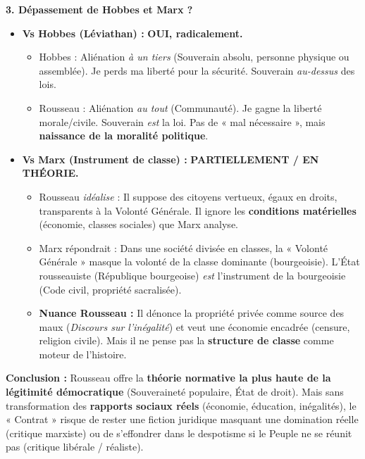 \documentclass[11pt]{article}
\begin{document}
\begin{exoresolu}
\textbf{3. Dépassement de Hobbes et Marx ?}
\begin{itemize}
    \item \textbf{Vs Hobbes (Léviathan) :} \textbf{OUI, radicalement.}
    \begin{itemize}
        \item Hobbes : Aliénation \emph{à un tiers} (Souverain absolu, personne physique ou assemblée). Je perds ma liberté pour la sécurité. Souverain \emph{au-dessus} des lois.
        \item Rousseau : Aliénation \emph{au tout} (Communauté). Je gagne la liberté morale/civile. Souverain \emph{est} la loi. Pas de « mal nécessaire », mais \textbf{naissance de la moralité politique}.
    \end{itemize}
    \item \textbf{Vs Marx (Instrument de classe) :} \textbf{PARTIELLEMENT / EN THÉORIE.}
    \begin{itemize}
        \item Rousseau \emph{idéalise} : Il suppose des citoyens vertueux, égaux en droits, transparents à la Volonté Générale. Il ignore les \textbf{conditions matérielles} (économie, classes sociales) que Marx analyse.
        \item Marx répondrait : Dans une société divisée en classes, la « Volonté Générale » masque la volonté de la classe dominante (bourgeoisie). L'État rousseauiste (République bourgeoise) \emph{est} l'instrument de la bourgeoisie (Code civil, propriété sacralisée).
        \item \textbf{Nuance Rousseau :} Il dénonce la propriété privée comme source des maux (\emph{Discours sur l'inégalité}) et veut une économie encadrée (censure, religion civile). Mais il ne pense pas la \textbf{structure de classe} comme moteur de l'histoire.
    \end{itemize}
\end{itemize}
\textbf{Conclusion :} Rousseau offre la \textbf{théorie normative la plus haute de la légitimité démocratique} (Souveraineté populaire, État de droit). Mais sans transformation des \textbf{rapports sociaux réels} (économie, éducation, inégalités), le « Contrat » risque de rester une fiction juridique masquant une domination réelle (critique marxiste) ou de s'effondrer dans le despotisme si le Peuple ne se réunit pas (critique libérale / réaliste).
\end{exoresolu}
\end{document}

